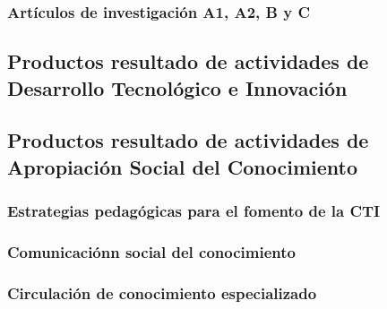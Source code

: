 \documentclass[12pt]{article}
\begin{document}
\subsubsection{Art\'iculos de investigaci\'on A1, A2, B y C}

\subsection{Productos resultado de actividades de Desarrollo
  Tecnol\'ogico e Innovaci\'on} 

\subsection{Productos resultado de actividades de Apropiación Social
  del Conocimiento} 

\subsubsection{Estrategias pedag\'ogicas para el fomento de la CTI}

\subsubsection{Comunicaci\'onn social del conocimiento}

\subsubsection{Circulaci\'on de conocimiento especializado}

\end{document}
